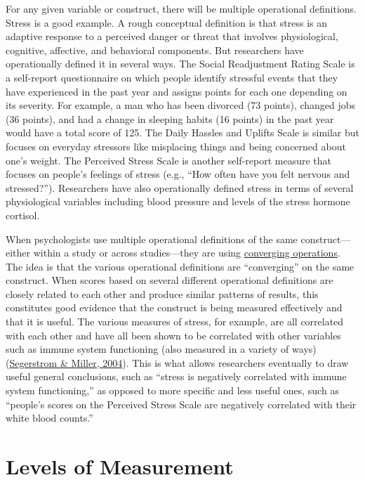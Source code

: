 \documentclass[
]{krantz}
\begin{document}
For any given variable or construct, there will be multiple operational definitions. Stress is a good example. A rough conceptual definition is that stress is an adaptive response to a perceived danger or threat that involves physiological, cognitive, affective, and behavioral components. But researchers have operationally defined it in several ways. The Social Readjustment Rating Scale is a self-report questionnaire on which people identify stressful events that they have experienced in the past year and assigns points for each one depending on its severity. For example, a man who has been divorced (73 points), changed jobs (36 points), and had a change in sleeping habits (16 points) in the past year would have a total score of 125. The Daily Hassles and Uplifts Scale is similar but focuses on everyday stressors like misplacing things and being concerned about one's weight. The Perceived Stress Scale is another self-report measure that focuses on people's feelings of stress (e.g., ``How often have you felt nervous and stressed?''). Researchers have also operationally defined stress in terms of several physiological variables including blood pressure and levels of the stress hormone cortisol.

When psychologists use multiple operational definitions of the same construct---either within a study or across studies---they are using \protect\hyperlink{converging-operations}{converging operations}. The idea is that the various operational definitions are ``converging'' on the same construct. When scores based on several different operational definitions are closely related to each other and produce similar patterns of results, this constitutes good evidence that the construct is being measured effectively and that it is useful. The various measures of stress, for example, are all correlated with each other and have all been shown to be correlated with other variables such as immune system functioning (also measured in a variety of ways) (\protect\hyperlink{ref-segerstrom2004psychological}{Segerstrom \& Miller, 2004}). This is what allows researchers eventually to draw useful general conclusions, such as ``stress is negatively correlated with immune system functioning,'' as opposed to more specific and less useful ones, such as ``people's scores on the Perceived Stress Scale are negatively correlated with their white blood counts.''

\hypertarget{levels-of-measurement}{%
\section{Levels of Measurement}\label{levels-of-measurement}}
\end{document}
